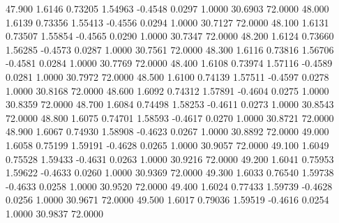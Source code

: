   47.900   1.6146   0.73205   1.54963  -0.4548   0.0297   1.0000  30.6903  72.0000
  48.000   1.6139   0.73356   1.55413  -0.4556   0.0294   1.0000  30.7127  72.0000
  48.100   1.6131   0.73507   1.55854  -0.4565   0.0290   1.0000  30.7347  72.0000
  48.200   1.6124   0.73660   1.56285  -0.4573   0.0287   1.0000  30.7561  72.0000
  48.300   1.6116   0.73816   1.56706  -0.4581   0.0284   1.0000  30.7769  72.0000
  48.400   1.6108   0.73974   1.57116  -0.4589   0.0281   1.0000  30.7972  72.0000
  48.500   1.6100   0.74139   1.57511  -0.4597   0.0278   1.0000  30.8168  72.0000
  48.600   1.6092   0.74312   1.57891  -0.4604   0.0275   1.0000  30.8359  72.0000
  48.700   1.6084   0.74498   1.58253  -0.4611   0.0273   1.0000  30.8543  72.0000
  48.800   1.6075   0.74701   1.58593  -0.4617   0.0270   1.0000  30.8721  72.0000
  48.900   1.6067   0.74930   1.58908  -0.4623   0.0267   1.0000  30.8892  72.0000
  49.000   1.6058   0.75199   1.59191  -0.4628   0.0265   1.0000  30.9057  72.0000
  49.100   1.6049   0.75528   1.59433  -0.4631   0.0263   1.0000  30.9216  72.0000
  49.200   1.6041   0.75953   1.59622  -0.4633   0.0260   1.0000  30.9369  72.0000
  49.300   1.6033   0.76540   1.59738  -0.4633   0.0258   1.0000  30.9520  72.0000
  49.400   1.6024   0.77433   1.59739  -0.4628   0.0256   1.0000  30.9671  72.0000
  49.500   1.6017   0.79036   1.59519  -0.4616   0.0254   1.0000  30.9837  72.0000

